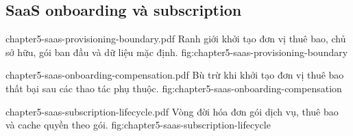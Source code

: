 \subsection{SaaS onboarding và subscription}

\extendeddiagramfigure{0.72\textheight}
  {chapter5-saas-provisioning-boundary.pdf}
  {Ranh giới khởi tạo đơn vị thuê bao, chủ sở hữu, gói ban đầu và dữ liệu mặc định.}
  {fig:chapter5-saas-provisioning-boundary}

\extendeddiagramfigure{0.72\textheight}
  {chapter5-saas-onboarding-compensation.pdf}
  {Bù trừ khi khởi tạo đơn vị thuê bao thất bại sau các thao tác phụ thuộc.}
  {fig:chapter5-saas-onboarding-compensation}

\extendeddiagramfigure{0.72\textheight}
  {chapter5-saas-subscription-lifecycle.pdf}
  {Vòng đời hóa đơn gói dịch vụ, thuê bao và cache quyền theo gói.}
  {fig:chapter5-saas-subscription-lifecycle}

\FloatBarrier
\clearpage
